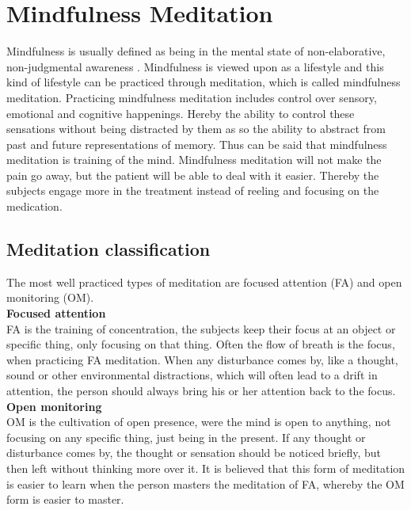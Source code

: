 \section{Mindfulness Meditation}
Mindfulness is usually defined as being in the mental state of non-elaborative, non-judgmental awareness \cite{Zeidan2012,Zeidan2016,Tang2017}. Mindfulness is viewed upon as a lifestyle and this kind of lifestyle can be practiced through meditation, which is called mindfulness meditation. Practicing mindfulness meditation includes control over sensory, emotional and cognitive happenings. Hereby the ability to control these sensations without being distracted by them as so the ability to abstract from past and future representations of memory. Thus can be said that mindfulness meditation is training of the mind. \cite{Tang2017}
Mindfulness meditation will not make the pain go away, but the patient will be able to deal with it easier. Thereby the subjects engage more in the treatment instead of reeling and focusing on the medication. \cite{Jacob2016}

\subsection{Meditation classification}
The most well practiced types of meditation are focused attention (FA) and open monitoring (OM).\cite{Zeidan2016}\\
\textbf{Focused attention}\\ 
FA is the training of concentration, the subjects keep their focus at an object or specific thing, only focusing on that thing. Often the flow of breath is the focus, when practicing FA meditation.  When any disturbance comes by, like a thought, sound or other environmental distractions, which will often lead to a drift in attention, the person should always bring his or her attention back to the focus. \cite{Zeidan2016}\\
\textbf{Open monitoring}\\
OM is the cultivation of open presence, were the mind is open to anything, not focusing on any specific thing, just being in the present. If any thought or disturbance comes by, the thought or sensation should be noticed briefly, but then left without thinking more over it. It is believed that this form of meditation is easier to learn when the person masters the meditation of FA, whereby the OM form is easier to master. \cite{Zeidan2016}


